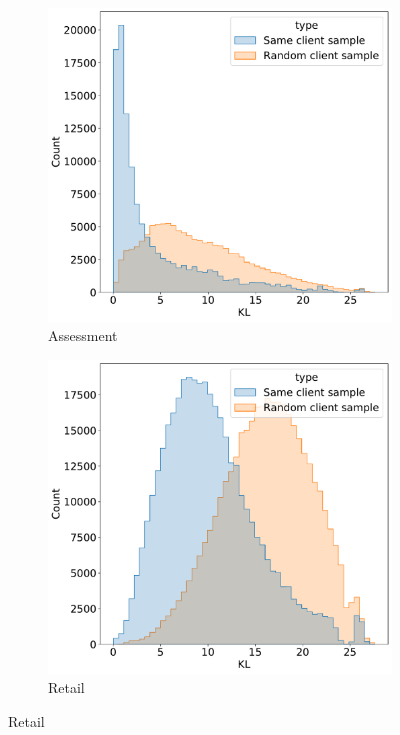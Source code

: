 \documentclass[sigconf]{acmart}
\begin{document}
\begin{figure}
\begin{subfigure}{0.5\linewidth}
  \end{subfigure}
  \begin{subfigure}{0.5\linewidth}
    \caption{Assessment}
    \includegraphics[width=\linewidth]{figures/kl_dis_assessment.pdf}
  \end{subfigure}%
  \begin{subfigure}{0.5\linewidth}
    \caption{Retail}
    \includegraphics[width=\linewidth]{figures/kl_dis_retail.pdf}

\end{subfigure}
\end{figure}
\end{document}
